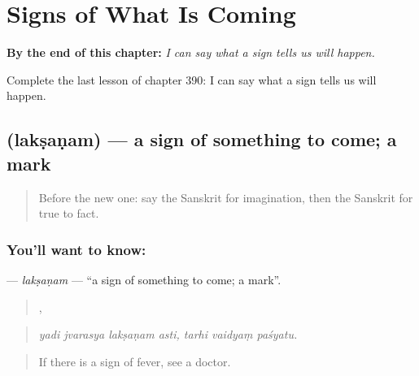
\chapter{Signs of What Is Coming}
\label{ch:sa-signs-of-what-is-coming}

\begin{chapteropening}
\textbf{By the end of this chapter:} \emph{I can say what a sign tells us will happen.}

Complete the last lesson of chapter 390: I can say what a sign tells us will happen.
\end{chapteropening}

\section[\texorpdfstring{\sk{लक्षणम्} (lakṣaṇam)}{लक्षणम् (lakṣaṇam)}]{ (lakṣaṇam) — a sign of something to come; a mark}

\label{lesson:SA-C390-laksanam}



\begin{quote}
Before the new one: say the Sanskrit for imagination, then the Sanskrit for true to fact.
\end{quote}

\subsection*{You'll want to know: }
\textbf{} — \emph{lakṣaṇam} — \textquotedblleft{}a sign of something to come; a mark\textquotedblright{}.

\begin{quote}
   ,   
\end{quote}

\begin{quote}
\emph{yadi jvarasya lakṣaṇam asti, tarhi vaidyaṃ paśyatu.}
\end{quote}

\begin{quote}
If there is a sign of fever, see a doctor.
\end{quote}

